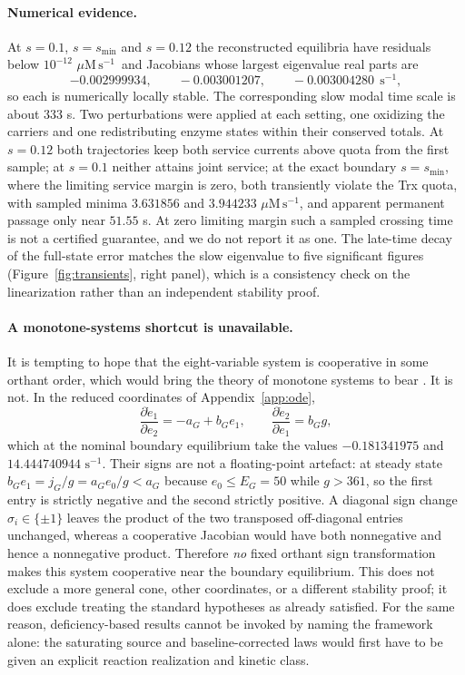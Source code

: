 \documentclass[11pt,a4paper]{article}
\theoremstyle{plain}
\theoremstyle{definition}
\theoremstyle{remark}
\newcommand{\fluxunit}{\ensuremath{\mu\mathrm{M}\,\mathrm{s}^{-1}}}
\begin{document}
\paragraph{Numerical evidence.}
At $s=0.1$, $s=s_{\min}$ and $s=0.12$ the reconstructed equilibria have residuals
below $10^{-12}$ \fluxunit\ and Jacobians whose largest eigenvalue real parts are
\[
  -0.002999934,\qquad -0.003001207,\qquad -0.003004280\ \ \mathrm{s}^{-1},
\]
so each is numerically locally stable. The corresponding slow modal time scale is
about $333$ s. Two perturbations were applied at each setting, one oxidizing the
carriers and one redistributing enzyme states within their conserved totals. At
$s=0.12$ both trajectories keep both service currents above quota from the first
sample; at $s=0.1$ neither attains joint service; at the exact boundary
$s=s_{\min}$, where the limiting service margin is zero, both transiently violate
the Trx quota, with sampled minima $3.631856$ and $3.944233$ \fluxunit, and
apparent permanent passage only near $51.55$ s. At zero limiting margin such a
sampled crossing time is not a certified guarantee, and we do not report it as one.
The late-time decay of the full-state error matches the slow eigenvalue to five
significant figures (Figure~\ref{fig:transients}, right panel), which is a
consistency check on the linearization rather than an independent stability proof.

\paragraph{A monotone-systems shortcut is unavailable.}
It is tempting to hope that the eight-variable system is cooperative in some
orthant order, which would bring the theory of monotone systems to bear
\citep{hirsch1985,smith1995,angeli2003}. It is not. In the reduced coordinates of
Appendix~\ref{app:ode},
\begin{equation}\label{eq:coop}
  \frac{\partial\dot e_1}{\partial e_2}=-a_G+b_Ge_1,
  \qquad
  \frac{\partial\dot e_2}{\partial e_1}=b_Gg ,
\end{equation}
which at the nominal boundary equilibrium take the values $-0.181341975$ and
$14.444740944$ $\mathrm{s}^{-1}$. Their signs are not a floating-point artefact:
at steady state $b_Ge_1=j_G/g=a_Ge_0/g<a_G$ because $e_0\le E_G=50$ while
$g>361$, so the first entry is strictly negative and the second strictly positive.
A diagonal sign change $\sigma_i\in\{\pm1\}$ leaves the product of the two
transposed off-diagonal entries unchanged, whereas a cooperative Jacobian would
have both nonnegative and hence a nonnegative product. Therefore \emph{no} fixed
orthant sign transformation makes this system cooperative near the boundary
equilibrium. This does not exclude a more general cone, other coordinates, or a
different stability proof; it does exclude treating the standard hypotheses as
already satisfied. For the same reason, deficiency-based results
\citep{feinberg1987} cannot be invoked by naming the framework alone: the
saturating source and baseline-corrected laws would first have to be given an
explicit reaction realization and kinetic class.
\end{document}
